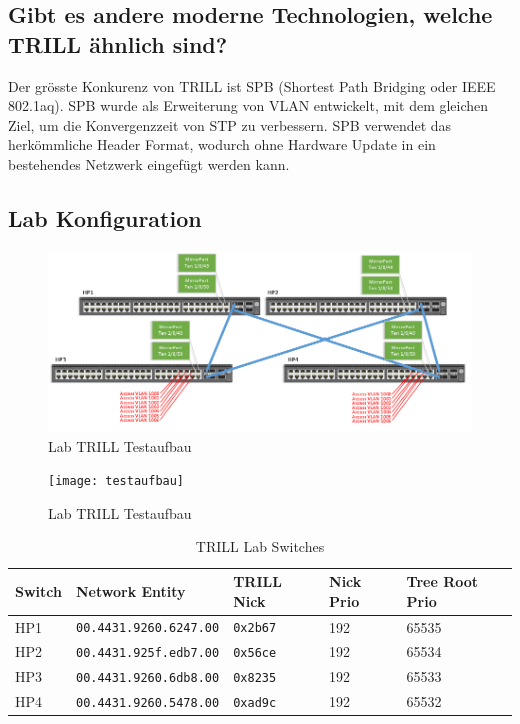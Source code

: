 \subsection{Gibt es andere moderne Technologien, welche TRILL ähnlich sind?}%
Der grösste Konkurenz von TRILL ist SPB (Shortest Path Bridging oder IEEE 802.1aq). SPB wurde als Erweiterung von VLAN entwickelt, mit dem gleichen Ziel, um die Konvergenzzeit von STP zu verbessern. SPB verwendet das herkömmliche Header Format, wodurch ohne Hardware Update in ein bestehendes Netzwerk eingefügt werden kann. 


\subsection{Lab Konfiguration}\label{sec:lab-konfiguration}
\begin{figure}[H]
	\centering
	\includegraphics[width=0.7\linewidth]{trill_network_layer2}
	\caption{Lab TRILL Testaufbau}
	\label{fig:trillnetworklayer2}
\end{figure}
\begin{figure}[H]
	\centering
	\texttt{[image: testaufbau]}
	\caption{Lab TRILL Testaufbau}
\end{figure}

\begin{table}[H]
	\centering
	\begin{tabu} to \linewidth {l l l l l}
		\toprule
		Switch & Network Entity & TRILL Nick & Nick Prio & Tree Root Prio \\
		\midrule
		HP1 & \lstinline|00.4431.9260.6247.00| & \lstinline|0x2b67| & 192 & 65535 \\
		HP2 & \lstinline|00.4431.925f.edb7.00| & \lstinline|0x56ce| & 192 & 65534 \\
		HP3 & \lstinline|00.4431.9260.6db8.00| & \lstinline|0x8235| & 192 & 65533 \\
		HP4 & \lstinline|00.4431.9260.5478.00| & \lstinline|0xad9c| & 192 & 65532 \\
		\bottomrule
	\end{tabu}
	\label{tbl:Labdevices}
	\caption{TRILL Lab Switches}
\end{table}


